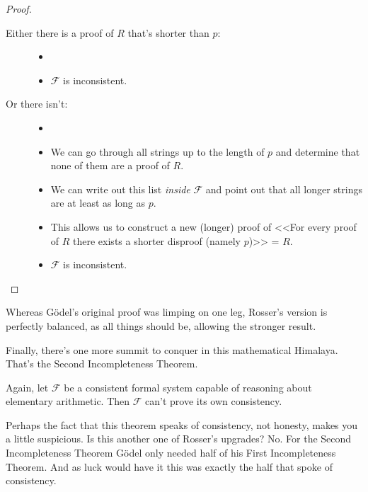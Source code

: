 \documentclass{article}
\theoremstyle{customstyle}
\newcommand{\F}{\ensuremath{\mathcal{F}}}
\begin{document}
\begin{proof}
\begin{description}
\begin{description}
\item[Either there is a proof of $R$ that's shorter than $p$:]
\begin{itemize}
\item[]
\item $\F$ is inconsistent. \lightning
\end{itemize}
\item[Or there isn't:]
\begin{itemize}
\item[]
\item We can go through all strings up to the length of $p$ and determine that none of them are a proof of $R$.
\item We can write out this list \textit{inside} $\F$ and point out that all longer strings are at least as long as $p$.
\item This allows us to construct a new (longer) proof of <<For every proof of $R$ there exists a shorter disproof (namely $p$)>> = $R$.
\item $\F$ is inconsistent. \lightning
\end{itemize}
\end{description}
\end{description}
\end{proof}

Whereas Gödel's original proof was limping on one leg, Rosser's version is perfectly balanced, as all things should be, allowing the stronger result.

Finally, there's one more summit to conquer in this mathematical Himalaya. That's the Second Incompleteness Theorem.

\begin{theorem}
Again, let $\F$ be a consistent formal system capable of reasoning about elementary arithmetic. Then $\F$ can't prove its own consistency.
\end{theorem}

Perhaps the fact that this theorem speaks of consistency, not honesty, makes you a little suspicious. Is this another one of Rosser's upgrades? No. For the Second Incompleteness Theorem Gödel only needed half of his First Incompleteness Theorem. And as luck would have it this was exactly the half that spoke of consistency.
\end{document}
